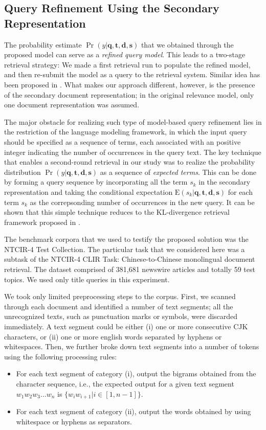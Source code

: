 \subsection{Query Refinement Using the Secondary
Representation}\label{s:query-modeling}

The probability estimate $\Pr(y|\mathbf{q}, \mathbf{t}, \mathbf{d},
\mathbf{s})$ that we obtained through the proposed model can serve as a
\emph{refined query model}.  This leads to a two-stage retrieval strategy: We
made a first retrieval run to populate the refined model, and then re-submit
the model as a query to the retrieval system.  Similar idea has been proposed
in \cite{lavrenko2001relevance}.  What makes our approach different, however,
is the presence of the secondary document representation; in the original
relevance model, only one document representation was assumed.

The major obstacle for realizing such type of model-based query refinement lies
in the restriction of the language modeling framework, in which the input query
should be specified as a sequence of terms, each associated with an positive
integer indicating the number of occurrences in the query text.  The key
technique that enables a second-round retrieval in our study was to realize the
probability distribution $\Pr(y|\mathbf{q}, \mathbf{t}, \mathbf{d},
\mathbf{s})$ as a sequence of \emph{expected terms}.  This can be done by
forming a query sequence by incorporating all the term $s_k$ in the secondary
representation and taking the conditional expectation
$\mathrm{E}(s_k|\mathbf{q}, \mathbf{t}, \mathbf{d}, \mathbf{s})$ for each term
$s_k$ as the correpsonding number of occurrences in the new query.  It can be
shown that this simple technique reduces to the KL-divergence retrieval
framework proposed in \cite{zhai2001language}. 

The benchmark corpora that we used to testify the proposed solution was the
NTCIR-4 Test Collection.  The particular task that we considered here was a
subtask of the NTCIR-4 CLIR Task: Chinese-to-Chinese monolingual document
retrieval.  The dataset comprised of 381,681 newswire articles and totally 59
test topics.  We used only title queries in this experiment.

We took only limited preprocessing steps to the corpus.  First, we scanned
through each document and identified a number of text segments; all the
unrecognized texts, such as punctuation marks or symbols, were discarded
immediately.  A text segment could be either (i) one or more consecutive CJK
characters, or (ii) one or more english words separated by hyphens or
whitespaces.  Then, we further broke down text segments into a number of tokens
using the following processing rules:  \begin{itemize} \item For each text
segment of category (i), output the bigrams obtained from the character
sequence, i.e., the expected output for a given text segment $w_1 w_2 w_3
\ldots w_n$ is $\{ w_i w_{i+1} | i \in [1, n-1] \}$.  \item For each text
segment of category (ii), output the words obtained by using whitespace or
hyphens as separators.  \end{itemize} 

